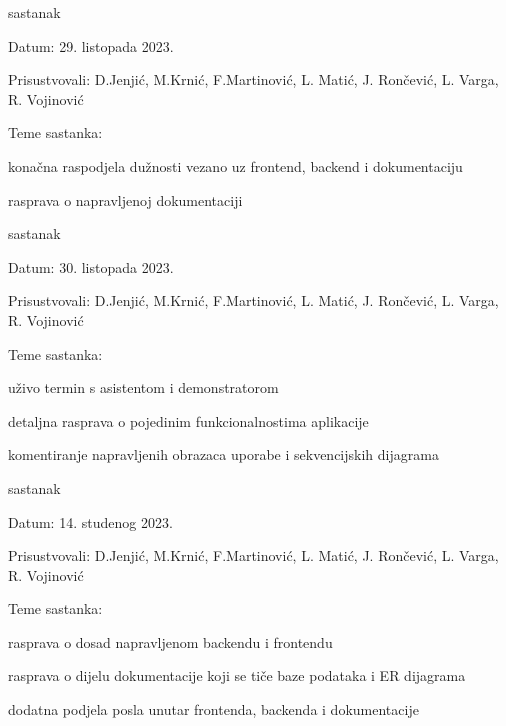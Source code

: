 \begin{packed_enum}
\begin{packed_item}
\begin{packed_item}
				\end{packed_item}
			\end{packed_item}
			
			\item  sastanak
			\item[] \begin{packed_item}

				\item Datum: 29. listopada 2023.
				\item Prisustvovali: D.Jenjić, M.Krnić, F.Martinović, L. Matić, J. Rončević, L. Varga, R. Vojinović
				\item Teme sastanka:
				\begin{packed_item}
					\item  konačna raspodjela dužnosti vezano uz frontend, backend i dokumentaciju
					\item  rasprava o napravljenoj dokumentaciji
				\end{packed_item}
			\end{packed_item}
			
			\vspace{1cm}
			
			\item  sastanak
			\item[] \begin{packed_item}
				\item Datum: 30. listopada 2023.
				\item Prisustvovali: D.Jenjić, M.Krnić, F.Martinović, L. Matić, J. Rončević, L. Varga, R. Vojinović
				\item Teme sastanka:
				\begin{packed_item}
					\item  uživo termin s asistentom i demonstratorom
					\item  detaljna rasprava o pojedinim funkcionalnostima aplikacije
					\item  komentiranje napravljenih obrazaca uporabe i sekvencijskih dijagrama
				\end{packed_item}
			\end{packed_item}
			
			\item  sastanak
			\item[] \begin{packed_item}
				\item Datum: 14. studenog 2023.
				\item Prisustvovali: D.Jenjić, M.Krnić, F.Martinović, L. Matić, J. Rončević, L. Varga, R. Vojinović
				\item Teme sastanka:
				\begin{packed_item}
					\item  rasprava o dosad napravljenom backendu i frontendu
					\item  rasprava o dijelu dokumentacije koji se tiče baze podataka i ER dijagrama
					\item  dodatna podjela posla unutar frontenda, backenda i dokumentacije
				\end{packed_item}
			\end{packed_item}
			

\end{packed_enum}
